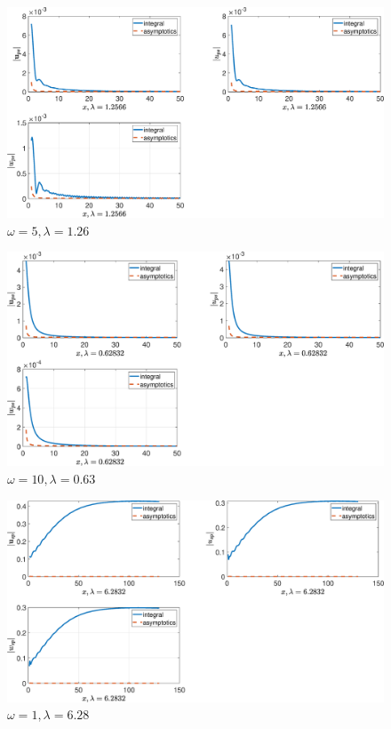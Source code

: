 \begin{figure}[!h]\centering\includegraphics[scale=0.38]{upsw5cp(1)2cp(2)1cs(1)0,5cs(20,3rho(1)2rho(2)1.eps}\caption{$ \omega = 5, \lambda = 1.26$}\end{figure}

\begin{figure}[!h]\centering\includegraphics[scale=0.38]{upsw10cp(1)2cp(2)1cs(1)0,5cs(20,3rho(1)2rho(2)1.eps}\caption{$ \omega = 10, \lambda = 0.63$}\end{figure}

\begin{figure}[!h]\centering\includegraphics[scale=0.38]{uspw1cp(1)2cp(2)1cs(1)0,5cs(20,3rho(1)2rho(2)1.eps}\caption{$ \omega = 1, \lambda = 6.28$}\end{figure}

